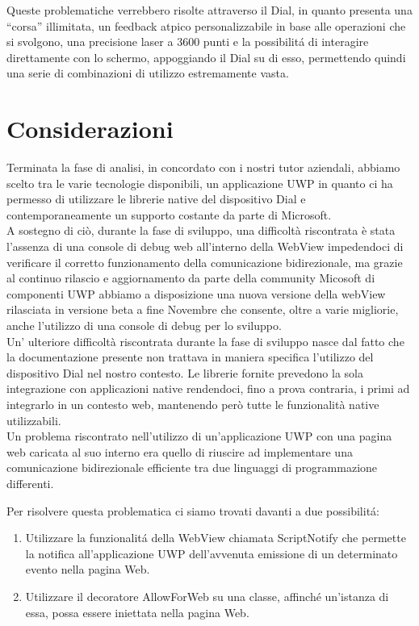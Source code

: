 Queste problematiche verrebbero risolte attraverso il Dial, in quanto presenta una “corsa” illimitata, un feedback atpico personalizzabile in base alle operazioni che si svolgono, una precisione laser a 3600 punti e la possibilitá di interagire direttamente con lo schermo, appoggiando il Dial su di esso, permettendo quindi una serie di combinazioni di utilizzo estremamente vasta.

\section{Considerazioni}
Terminata la fase di analisi, in concordato con i nostri tutor aziendali, abbiamo scelto tra le varie tecnologie disponibili, un applicazione UWP in quanto ci ha permesso di utilizzare le librerie native del dispositivo Dial e contemporaneamente un supporto costante da parte di Microsoft.\\

A sostegno di ciò, durante la fase di sviluppo, una difficoltà riscontrata è stata l'assenza di una console di debug web all'interno della WebView impedendoci di verificare il corretto funzionamento della comunicazione bidirezionale, ma grazie al continuo rilascio e aggiornamento da parte della community Micosoft di componenti UWP abbiamo a disposizione una nuova versione della webView\cite{wv2} rilasciata in versione beta a fine Novembre che consente, oltre a varie migliorie, anche l'utilizzo di una console di debug per lo sviluppo\cite{dwv2}.\\

Un' ulteriore difficoltà riscontrata durante la fase di sviluppo nasce dal fatto che la documentazione presente non trattava in maniera specifica l'utilizzo del dispositivo Dial nel nostro contesto.
Le librerie fornite prevedono la sola integrazione con applicazioni native rendendoci, fino a prova contraria, i primi ad integrarlo in un contesto web, mantenendo però tutte le funzionalità native utilizzabili.\\

Un problema riscontrato nell'utilizzo di un'applicazione UWP con una pagina web caricata al suo interno era quello di riuscire ad implementare una comunicazione bidirezionale efficiente tra due linguaggi di programmazione differenti.

Per risolvere questa problematica ci siamo trovati davanti a due possibilitá:

\begin{enumerate}
\item Utilizzare la funzionalitá della WebView chiamata ScriptNotify che permette la notifica all'applicazione UWP dell'avvenuta emissione di un determinato evento nella pagina Web.
\item Utilizzare il decoratore AllowForWeb su una classe, affinché un'istanza di essa, possa essere iniettata nella pagina Web.
\end{enumerate}

